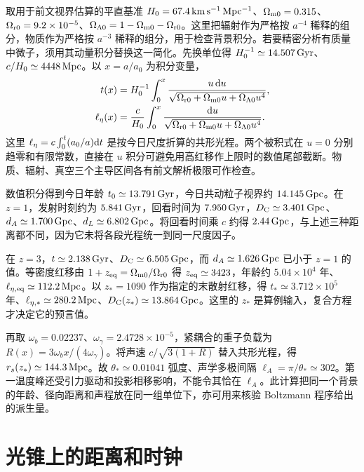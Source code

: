取用于前文视界估算的平直基准 $H_0=67.4\,{\rm km\,s^{-1}\,Mpc^{-1}}$、$\Omega_{\rm m0}=0.315$、$\Omega_{\rm r0}=9.2\times10^{-5}$、$\Omega_{\Lambda0}=1-\Omega_{\rm m0}-\Omega_{\rm r0}$。这里把辐射作为严格按 $a^{-4}$ 稀释的组分，物质作为严格按 $a^{-3}$ 稀释的组分，用于检查背景积分。若要精密分析有质量中微子，须用其动量积分替换这一简化。先换单位得 $H_0^{-1}\simeq14.507\,{\rm Gyr}$、$c/H_0\simeq4448\,{\rm Mpc}$。以 $x=a/a_0$ 为积分变量，
\[
 \begin{split}
 t(x)&=H_0^{-1}\int_0^x
       \frac{u\,\dd u}{\sqrt{\Omega_{\rm r0}+\Omega_{\rm m0}u+
                                   \Omega_{\Lambda0}u^4}},\\
 \ell_\eta(x)&=\frac{c}{H_0}\int_0^x
       \frac{\dd u}{\sqrt{\Omega_{\rm r0}+\Omega_{\rm m0}u+
                                   \Omega_{\Lambda0}u^4}} .
 \end{split}
\]
这里 $\ell_\eta=c\int_0^t(a_0/a)\dd t$ 是按今日尺度折算的共形光程。两个被积式在 $u=0$ 分别趋零和有限常数，直接在 $u$ 积分可避免用高红移作上限时的数值尾部截断。物质、辐射、真空三个主导区间各有前文解析极限可作检查。

数值积分得到今日年龄 $t_0\simeq13.791\,{\rm Gyr}$，今日共动粒子视界约 $14.145\,{\rm Gpc}$。在 $z=1$，发射时刻约为 $5.841\,{\rm Gyr}$，回看时间为 $7.950\,{\rm Gyr}$，$D_{\rm C}\simeq3.401\,{\rm Gpc}$、$d_A\simeq1.700\,{\rm Gpc}$、$d_L\simeq6.802\,{\rm Gpc}$。将回看时间乘 $c$ 约得 $2.44\,{\rm Gpc}$，与上述三种距离都不同，因为它未将各段光程统一到同一尺度因子。

在 $z=3$，$t\simeq2.138\,{\rm Gyr}$、$D_{\rm C}\simeq6.505\,{\rm Gpc}$，而 $d_A\simeq1.626\,{\rm Gpc}$ 已小于 $z=1$ 的值。等密度红移由 $1+z_{\rm eq}=\Omega_{\rm m0}/\Omega_{\rm r0}$ 得 $z_{\rm eq}\simeq3423$，年龄约 $5.04\times10^4$ 年、$\ell_{\eta,\rm eq}\simeq112.2\,{\rm Mpc}$。以 $z_*=1090$ 作为指定的末散射红移，得 $t_*\simeq3.712\times10^5$ 年、$\ell_{\eta,*}\simeq280.2\,{\rm Mpc}$、$D_{\rm C}(z_*)\simeq13.864\,{\rm Gpc}$。这里的 $z_*$ 是算例输入，复合方程才决定它的预言值。

再取 $\omega_b=0.02237$、$\omega_\gamma=2.4728\times10^{-5}$，紧耦合的重子负载为 $R(x)=3\omega_b x/(4\omega_\gamma)$。将声速 $c/\sqrt{3(1+R)}$ 替入共形光程，得 $r_s(z_*)\simeq144.3\,{\rm Mpc}$。故 $\theta_*\simeq0.01041$ 弧度、声学多极间隔 $\ell_A=\pi/\theta_*\simeq302$。第一温度峰还受引力驱动和投影相移影响，不能令其恰在 $\ell_A$。此计算把同一个背景的年龄、径向距离和声程放在同一组单位下，亦可用来核验 Boltzmann 程序给出的派生量。

\section{光锥上的距离和时钟}\label{sec:cosmo-distances}

